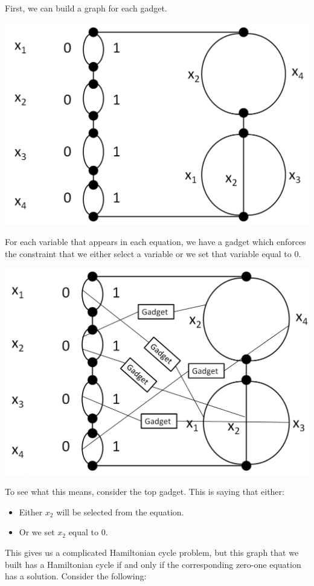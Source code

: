 \documentclass[letterpaper]{article}
\begin{document}
First, we can build a graph for each gadget. 
\begin{center}
    \includegraphics[scale=0.30]{assets/zoe_ham_12.png}
\end{center} 
For each variable that appears in each equation, we have a gadget which enforces the constraint that we either select a variable or we set that variable equal to 0. 
\begin{center}
    \includegraphics[scale=0.30]{assets/zoe_ham_11.png}
\end{center} 
To see what this means, consider the top gadget. This is saying that either: 
\begin{itemize}
    \item Either $x_2$ will be selected from the equation. 
    \item Or we set $x_2$ equal to 0. 
\end{itemize}
This gives us a complicated Hamiltonian cycle problem, but this graph that we built has a Hamiltonian cycle if and only if the corresponding zero-one equation has a solution. Consider the following: 
\end{document}
